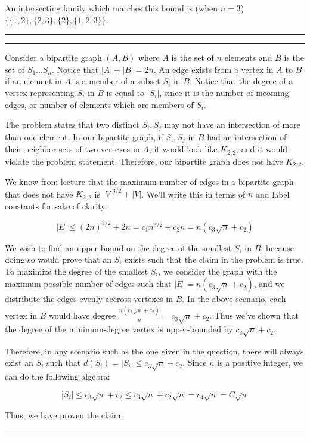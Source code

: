 \documentclass[11pt,letterpaper]{article}
\newcommand{\question}[1] {\vspace{.25in} \hrule\vspace{0.5em}
\noindent{\bf #1} \vspace{0.5em}
\hrule \vspace{.10in}}
\begin{document}
An intersecting family which matches this bound is (when $n=3$) $\lbrace \lbrace 1,2 \rbrace, \lbrace 2,3 \rbrace, \lbrace 2 \rbrace, \lbrace 1,2,3 \rbrace \rbrace$.

\question{5}

Consider a bipartite graph $(A,B)$ where $A$ is the set of $n$ elements and $B$ is the set of $S_1...S_n$. Notice that $|A| + |B| = 2n$.
An edge exists from a vertex in $A$ to $B$ if an element in $A$ is a member of a subset $S_i$ in $B$. Notice that the degree of a vertex representing $S_i$ in $B$ is equal to $|S_i|$, since it is the number of incoming edges, or number of elements which are members of $S_i$.

The problem states that two distinct $S_i, S_j$ may not have an intersection of more than one element.
In our bipartite graph, if $S_i, S_j$ in $B$ had an intersection of their neighbor sets of two vertexes in $A$, it would look like $K_{2,2}$,
and it would violate the problem statement. Therefore, our bipartite graph does not have $K_{2,2}$.

We know from lecture that the maximum number of edges in a bipartite graph that does not have $K_{2,2}$ is $|V|^{3/2} + |V|$. We'll write this in terms of $n$ and label constants for sake of clarity.

$$ |E| \leq (2n)^{3/2} + 2n = c_1 n^{3/2} + c_2n = n(c_3 \sqrt{n} + c_2) $$

We wish to find an upper bound on the degree of the smallest $S_i$ in $B$, because doing so would prove that an $S_i$ exists such that the claim in the problem is true.
To maximize the degree of the smallest $S_i$, we consider the graph with the maximum possible number of edges such that $|E| = n(c_3 \sqrt{n} + c_2)$, and we distribute the edges evenly accross vertexes in $B$.
In the above scenario, each vertex in $B$ would have degree $\frac{n(c_3 \sqrt{n} + c_2)}{n} = c_3 \sqrt{n} + c_2$. Thus we've shown that the degree of the minimum-degree vertex is upper-bounded by $c_3 \sqrt{n} + c_2$.

Therefore, in any scenario such as the one given in the question, there will always exist an $S_i$ such that $d(S_i) = |S_i| \leq c_3 \sqrt{n} + c_2$.
Since $n$ is a positive integer, we can do the following algebra:

$$|S_i| \leq c_3 \sqrt{n} + c_2 \leq c_3 \sqrt{n} + c_2 \sqrt{n} = c_4 \sqrt{n} = C \sqrt{n}$$

Thus, we have proven the claim.


\question{6}
\end{document}
